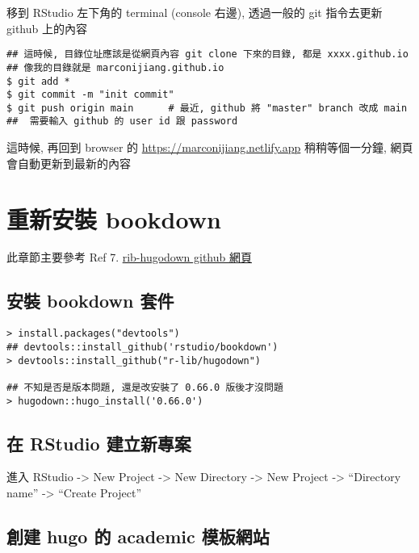 \documentclass[
]{book}
\begin{document}
移到 RStudio 左下角的 terminal (console 右邊), 透過一般的 git 指令去更新 github 上的內容

\begin{verbatim}
## 這時候, 目錄位址應該是從網頁內容 git clone 下來的目錄, 都是 xxxx.github.io
## 像我的目錄就是 marconijiang.github.io 
$ git add *
$ git commit -m "init commit"
$ git push origin main      # 最近, github 將 "master" branch 改成 main
##  需要輸入 github 的 user id 跟 password
\end{verbatim}

這時候, 再回到 browser 的 \url{https://marconijiang.netlify.app} 稍稍等個一分鐘, 網頁會自動更新到最新的內容

\hypertarget{ux91cdux65b0ux5b89ux88dd-bookdown}{%
\chapter{重新安裝 bookdown}\label{ux91cdux65b0ux5b89ux88dd-bookdown}}

此章節主要參考 Ref 7. \href{https://github.com/r-lib/hugodown}{rib-hugodown github 網頁}

\hypertarget{ux5b89ux88dd-bookdown-ux5957ux4ef6}{%
\section{安裝 bookdown 套件}\label{ux5b89ux88dd-bookdown-ux5957ux4ef6}}

\begin{verbatim}
> install.packages("devtools")
## devtools::install_github('rstudio/bookdown')
> devtools::install_github("r-lib/hugodown")

## 不知是否是版本問題, 還是改安裝了 0.66.0 版後才沒問題
> hugodown::hugo_install('0.66.0')
\end{verbatim}

\hypertarget{ux5728-rstudio-ux5efaux7acbux65b0ux5c08ux6848}{%
\section{在 RStudio 建立新專案}\label{ux5728-rstudio-ux5efaux7acbux65b0ux5c08ux6848}}

進入 RStudio -\textgreater{} New Project -\textgreater{} New Directory -\textgreater{} New Project -\textgreater{} ``Directory name'' -\textgreater{} ``Create Project''

\hypertarget{ux5275ux5efa-hugo-ux7684-academic-ux6a21ux677fux7db2ux7ad9}{%
\section{創建 hugo 的 academic 模板網站}\label{ux5275ux5efa-hugo-ux7684-academic-ux6a21ux677fux7db2ux7ad9}}
\end{document}
